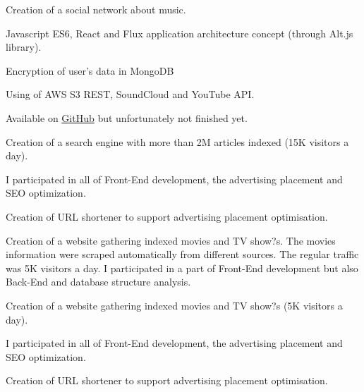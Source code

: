 \documentclass[letterpaper]{my-resume} %
\begin{document}
\begin{minipage}[t]{0.66\textwidth}

\begin{tightitemize}
\item Creation of a social network about music.
\item Javascript ES6, React and Flux application architecture concept (through Alt.js library).
\item Encryption of user's data in MongoDB
\item Using of AWS S3 REST, SoundCloud and YouTube API.
\item Available on \href{https://github.com/bokzor/musicShare}{GitHub} but unfortunately not finished yet.
\end{tightitemize}

\sectionspace %



\begin{tightitemize}
\item Creation of a search engine with more than 2M articles indexed (15K visitors a day).
\item I participated in all of Front-End development, the advertising placement and SEO optimization.
\item Creation of URL shortener to support advertising placement optimisation.
\end{tightitemize}

\sectionspace %



Creation of a website gathering indexed movies and TV show?s. The movies information were scraped automatically from different sources. The regular traffic was 5K visitors a day. I participated in a part of Front-End development but also Back-End and database structure analysis.
\begin{tightitemize}
\item Creation of a website gathering indexed movies and TV show?s (5K visitors a day).
\item I participated in all of Front-End development, the advertising placement and SEO optimization.
\item Creation of URL shortener to support advertising placement optimisation.
\end{tightitemize}


\end{minipage}
\end{document}
